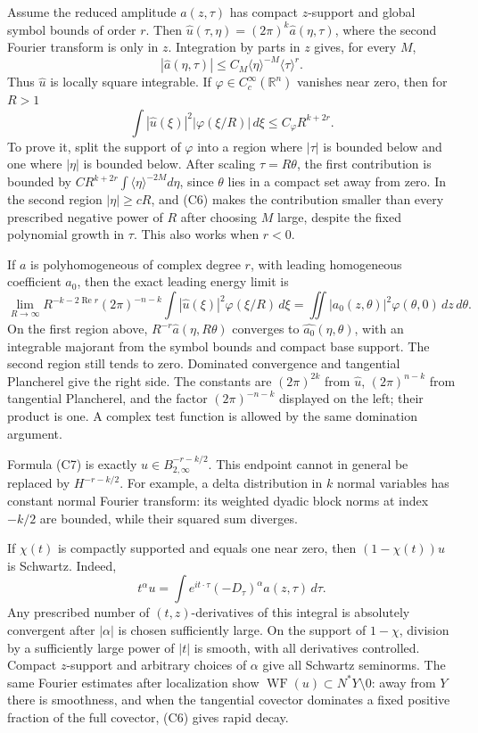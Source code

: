 \documentclass[
  11pt,
]{article}
\begin{document}
Assume the reduced amplitude \(a(z,\tau)\) has compact \(z\)-support and
global symbol bounds of order \(r\). Then
\(\widehat u(\tau,\eta)=(2\pi)^k\widehat a(\eta,\tau)\), where the
second Fourier transform is only in \(z\). Integration by parts in \(z\)
gives, for every \(M\), \[
|\widehat a(\eta,\tau)|\leq C_M\langle\eta\rangle^{-M}\langle\tau\rangle^r.
\tag{C6}
\] Thus \(\widehat u\) is locally square integrable. If
\(\varphi\in C_c^\infty(\mathbb R^n)\) vanishes near zero, then for
\(R>1\) \[
\int |\widehat u(\xi)|^2|\varphi(\xi/R)|\,d\xi
\leq C_\varphi R^{k+2r}.
\tag{C7}
\] To prove it, split the support of \(\varphi\) into a region where
\(|\tau|\) is bounded below and one where \(|\eta|\) is bounded below.
After scaling \(\tau=R\theta\), the first contribution is bounded by
\(CR^{k+2r}\int\langle\eta\rangle^{-2M}d\eta\), since \(\theta\) lies in
a compact set away from zero. In the second region \(|\eta|\geq cR\),
and (C6) makes the contribution smaller than every prescribed negative
power of \(R\) after choosing \(M\) large, despite the fixed polynomial
growth in \(\tau\). This also works when \(r<0\).

If \(a\) is polyhomogeneous of complex degree \(r\), with leading
homogeneous coefficient \(a_0\), then the exact leading energy limit is
\[
\lim_{R\to\infty}R^{-k-2\operatorname{Re}r}(2\pi)^{-n-k}
\int|\widehat u(\xi)|^2\varphi(\xi/R)\,d\xi
=\iint|a_0(z,\theta)|^2\varphi(\theta,0)\,dz\,d\theta.
\tag{C8}
\] On the first region above, \(R^{-r}\widehat a(\eta,R\theta)\)
converges to \(\widehat {a_0}(\eta,\theta)\), with an integrable
majorant from the symbol bounds and compact base support. The second
region still tends to zero. Dominated convergence and tangential
Plancherel give the right side. The constants are \((2\pi)^{2k}\) from
\(\widehat u\), \((2\pi)^{n-k}\) from tangential Plancherel, and the
factor \((2\pi)^{-n-k}\) displayed on the left; their product is one. A
complex test function is allowed by the same domination argument.

Formula (C7) is exactly \(u\in B^{-r-k/2}_{2,\infty}\). This endpoint
cannot in general be replaced by \(H^{-r-k/2}\). For example, a delta
distribution in \(k\) normal variables has constant normal Fourier
transform: its weighted dyadic block norms at index \(-k/2\) are
bounded, while their squared sum diverges.

If \(\chi(t)\) is compactly supported and equals one near zero, then
\((1-\chi(t))u\) is Schwartz. Indeed, \[
t^\alpha u=\int e^{it\cdot\tau}(-D_\tau)^\alpha a(z,\tau)\,d\tau.
\] Any prescribed number of \((t,z)\)-derivatives of this integral is
absolutely convergent after \(|\alpha|\) is chosen sufficiently large.
On the support of \(1-\chi\), division by a sufficiently large power of
\(|t|\) is smooth, with all derivatives controlled. Compact
\(z\)-support and arbitrary choices of \(\alpha\) give all Schwartz
seminorms. The same Fourier estimates after localization show
\(\operatorname{WF}(u)\subset N^*Y\setminus0\): away from \(Y\) there is
smoothness, and when the tangential covector dominates a fixed positive
fraction of the full covector, (C6) gives rapid decay.
\end{document}
